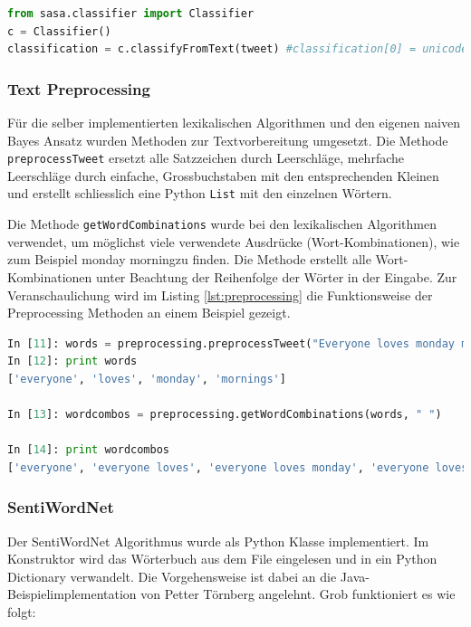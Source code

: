 \begin{lstlisting}[language=Python, caption={SASA Classifier}, label={lst:sasaexmaple}]
from sasa.classifier import Classifier
c = Classifier()
classification = c.classifyFromText(tweet) #classification[0] = unicode "neutral", "negative", "positive", "unsure", classification[1] = score
\end{lstlisting}
\subsubsection{Text Preprocessing}
\label{subsubsec:textpreprocessing}
Für die selber implementierten lexikalischen Algorithmen und den eigenen naiven Bayes Ansatz wurden Methoden zur Textvorbereitung umgesetzt. Die Methode \lstinline$preprocessTweet$ ersetzt alle Satzzeichen durch Leerschläge, mehrfache Leerschläge durch einfache, Grossbuchstaben mit den entsprechenden Kleinen und erstellt schliesslich eine Python \lstinline$List$ mit den einzelnen Wörtern.

Die Methode \lstinline$getWordCombinations$ wurde bei den lexikalischen Algorithmen verwendet, um möglichst viele verwendete Ausdrücke (\flqq Wort-Kombinationen\frqq), wie zum Beispiel \flqq monday morning\frqq zu finden.  Die Methode erstellt alle Wort-Kombinationen unter Beachtung der Reihenfolge der Wörter in der Eingabe. Zur Veranschaulichung wird im Listing \ref{lst:preprocessing} die Funktionsweise der Preprocessing Methoden an einem Beispiel gezeigt.

\begin{lstlisting}[language=Python, caption={Text Preprocessing}, label={lst:preprocessing}]
In [11]: words = preprocessing.preprocessTweet("Everyone loves monday mornings!") 
In [12]: print words
['everyone', 'loves', 'monday', 'mornings']

In [13]: wordcombos = preprocessing.getWordCombinations(words, " ")

In [14]: print wordcombos
['everyone', 'everyone loves', 'everyone loves monday', 'everyone loves monday mornings', 'loves', 'loves monday', 'loves monday mornings', 'monday',  'monday mornings', 'mornings']
\end{lstlisting} 

\subsubsection{SentiWordNet}
Der SentiWordNet Algorithmus wurde als Python Klasse implementiert. Im Konstruktor wird das Wörterbuch aus dem File eingelesen und in ein Python Dictionary verwandelt. Die Vorgehensweise ist dabei an die Java-Beispielimplementation von Petter Törnberg \cite{sentiwordnetjava} angelehnt. Grob funktioniert es wie folgt:

